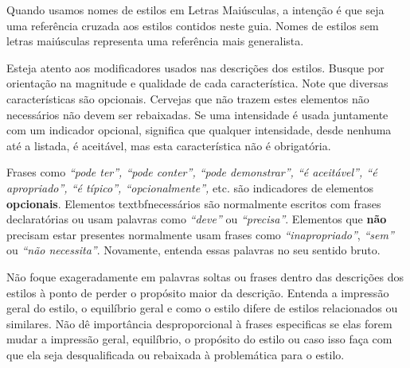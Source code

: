 Quando usamos nomes de estilos em Letras Maiúsculas, a intenção é que seja uma referência cruzada aos estilos contidos neste guia. Nomes de estilos sem letras maiúsculas representa uma referência mais generalista.

Esteja atento aos modificadores usados nas descrições dos estilos. Busque por orientação na magnitude e qualidade de cada característica. Note que diversas características são opcionais. Cervejas que não trazem estes elementos não necessários não devem ser rebaixadas. Se uma intensidade é usada juntamente com um indicador opcional, significa que qualquer intensidade, desde nenhuma até a listada, é aceitável, mas esta característica não é obrigatória.

Frases como \textit{“pode ter”, “pode conter”, “pode demonstrar”, “é aceitável”, “é apropriado”, “é típico”, “opcionalmente”,} etc. são indicadores de elementos \textbf{opcionais}. Elementos textbf{necessários} são normalmente escritos com frases declaratórias ou usam palavras como \textit{“deve”} ou \textit{“precisa”}. Elementos que \textbf{não} precisam estar presentes normalmente usam frases como \textit{“inapropriado”}, \textit{“sem”} ou \textit{“não necessita”}. Novamente, entenda essas palavras no seu sentido bruto.

Não foque exageradamente em palavras soltas ou frases dentro das descrições dos estilos à ponto de perder o propósito maior da descrição. Entenda a impressão geral do estilo, o equilíbrio geral e como o estilo difere de estilos relacionados ou similares. Não dê importância desproporcional à frases especificas se elas forem mudar a impressão geral, equilíbrio, o propósito do estilo ou caso isso faça com que ela seja desqualificada ou rebaixada à problemática para o estilo.